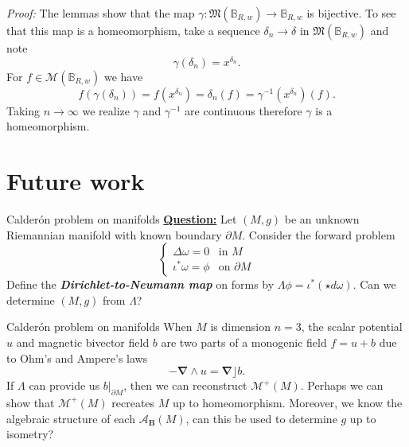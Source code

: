 \documentclass[aspectratio=169,handout]{beamer}
\newcommand\boldgreen[1]{\textcolor{lighter_csu_green}{\emph{\textbf{#1}}}}
\newcommand{\algebra}{\mathcal{A}}
\newcommand{\grad}{\boldsymbol{\nabla}}
\newcommand{\characters}{\mathfrak{M}}
\newcommand{\monogenics}{\mathcal{M}}
\newcommand{\ball}{\mathbb{B}}
\newcommand{\blade}[1]{\boldsymbol{#1}}
\newcommand{\boundary}{{\partial M}}
\newcommand{\monogenicfields}[1]{\mathcal{M}^{#1}(M)}
\newcommand{\bivector}{\blade{B}}
\begin{document}
\begin{frame}{}
\vfill
\emph{Proof:} The lemmas show that the map $\gamma \colon \characters(\ball_{R,w}) \to \ball_{R,w}$ is bijective. To see that this map is a homeomorphism, take a sequence $\delta_n \to \delta$ in $\characters(\ball_{R,w})$ and note
\[
\gamma(\delta_n)=x^{\delta_n}.
\]
For $f\in \monogenics(\ball_{R,w})$ we have
\[
f(\gamma(\delta_n))=f(x^{\delta_n})=\delta_n(f)=\gamma^{-1}(x^{\delta_n})(f).
\]
Taking $n\to \infty$ we realize $\gamma$ and $\gamma^{-1}$ are continuous therefore $\gamma$ is a homeomorphism.
\vfill
\end{frame}

\section{Future work}

\begin{frame}{Calder\'on problem on manifolds}
\vfill
\textbf{\underline{Question:}} Let $(M,g)$ be an unknown Riemannian manifold with known boundary $\partial M$. Consider the forward problem
\[
\begin{cases}
\Delta \omega = 0 & \textrm{in $M$}\\
\iota^*\omega = \phi & \textrm{on $\partial M$}
\end{cases}
\]
Define the \boldgreen{Dirichlet-to-Neumann map} on forms by $\Lambda\phi = \iota^*(\star d \omega)$. Can we determine $(M,g)$ from $\Lambda$?
\vfill
\end{frame}


\begin{frame}{Calder\'on problem on manifolds}
\vfill
When $M$ is dimension $n=3$, the scalar potential $u$ and magnetic bivector field $b$ are two parts of a monogenic field $f=u+b$ due to Ohm's and Ampere's laws 
\[
-\grad \wedge u = \grad \rfloor b.
\] 
If $\Lambda$ can provide us $b\vert_\boundary$, then we can reconstruct $\monogenicfields{+}$. Perhaps we can show that $\monogenicfields{+}$ recreates $M$ up to homeomorphism. Moreover, we know the algebraic structure of each $\algebra_{\bivector}(M)$, can this be used to determine $g$ up to isometry?
\vfill
\end{frame}
\end{document}
